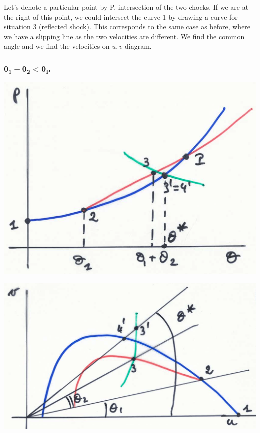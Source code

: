 Let's denote a particular point by P, intersection of the two chocks. If we are at the right of this point, we could intersect the curve 1 by drawing a curve for situation 3 (reflected shock). This corresponds to the same case as before, where we have a slipping line as the two velocities are different. We find the common angle and we find the velocities on $u,v$ diagram. 

\subsubsection{$\bm{\theta _1 + \theta _2 < \theta _P}$}
\begin{center}
\begin{minipage}{0.33\textwidth}
\includegraphics[scale=0.1]{ch9/20}
\end{minipage}
\begin{minipage}{0.4\textwidth}
\includegraphics[scale=0.1]{ch9/21}
\end{minipage}
\end{center}

